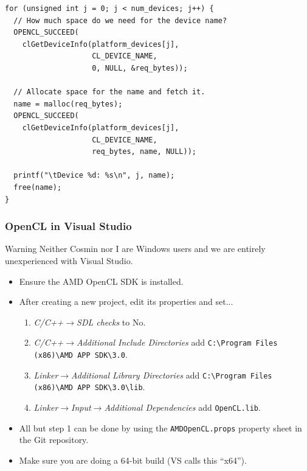 \documentclass{beamer}
\begin{document}
\begin{frame}[fragile]
\begin{lstlisting}
for (unsigned int j = 0; j < num_devices; j++) {
  // How much space do we need for the device name?
  OPENCL_SUCCEED(
    clGetDeviceInfo(platform_devices[j],
                    CL_DEVICE_NAME,
                    0, NULL, &req_bytes));

  // Allocate space for the name and fetch it.
  name = malloc(req_bytes);
  OPENCL_SUCCEED(
    clGetDeviceInfo(platform_devices[j],
                    CL_DEVICE_NAME,
                    req_bytes, name, NULL));

  printf("\tDevice %d: %s\n", j, name);
  free(name);
}
\end{lstlisting}
\end{frame}

\begin{frame}[fragile]
  \frametitle{OpenCL in Visual Studio}

  \begin{block}{Warning}
    Neither Cosmin nor I are Windows users and we are entirely
    unexperienced with Visual Studio.
  \end{block}

  \begin{itemize}
  \item Ensure the AMD OpenCL SDK is installed.
  \item After creating a new project, edit its properties and set...
    \begin{enumerate}
    \item \textit{C/C++$\rightarrow$SDL checks} to No.
    \item \textit{C/C++$\rightarrow$Additional Include Directories}
      add \verb!C:\Program Files (x86)\AMD APP SDK\3.0!.
    \item \textit{Linker$\rightarrow$Additional Library Directories}
      add \verb!C:\Program Files (x86)\AMD APP SDK\3.0\lib!.
    \item \textit{Linker$\rightarrow$Input$\rightarrow$Additional
        Dependencies} add \verb!OpenCL.lib!.
    \end{enumerate}
  \item All but step 1 can be done by using the
    \texttt{AMDOpenCL.props} property sheet in the Git repository.
  \item Make sure you are doing a 64-bit build (VS calls this
    ``x64'').
  \end{itemize}

\end{frame}
\end{document}
